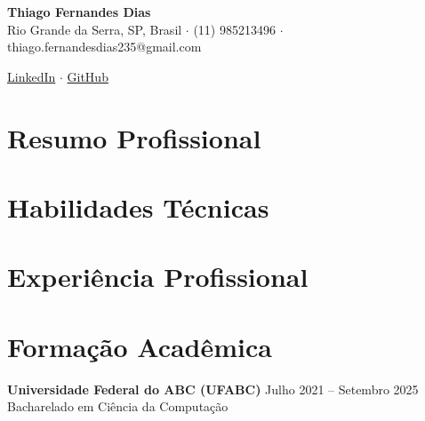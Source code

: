 \documentclass[a4paper,10pt]{article}
\begin{document}
\pagestyle{empty}

\begin{center}
    {\Huge \textbf{Thiago Fernandes Dias}} \\[0.5em] %
    Rio Grande da Serra, SP, Brasil $\cdot$ (11) 985213496 $\cdot$ thiago.fernandesdias235@gmail.com %

    \href{https://www.linkedin.com/in/thiago-fernandes-dias-5b90a118a}{LinkedIn} $\cdot$ %
    \href{https://github.com/Thiago-Fernandes-Dias}{GitHub} %
\end{center}

\vspace{0.5cm}

\section*{Resumo Profissional}


\section*{Habilidades Técnicas}


\section*{Experiência Profissional}


\section*{Formação Acadêmica}
\textbf{Universidade Federal do ABC (UFABC)} \hfill Julho 2021 -- Setembro 2025 \\ %
Bacharelado em Ciência da Computação %
\end{document}
